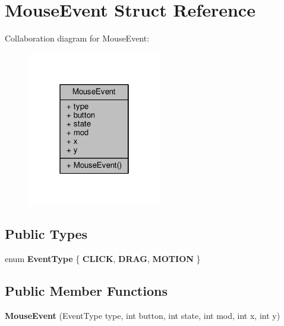 \hypertarget{structMouseEvent}{}\section{Mouse\+Event Struct Reference}
\label{structMouseEvent}


Collaboration diagram for Mouse\+Event\+:
\nopagebreak
\begin{figure}[H]
\begin{center}
\leavevmode
\includegraphics[width=166pt]{d9/df8/structMouseEvent__coll__graph}
\end{center}
\end{figure}
\subsection*{Public Types}
\begin{DoxyCompactItemize}
\item 
enum {\bfseries Event\+Type} \{ {\bfseries C\+L\+I\+CK}, 
{\bfseries D\+R\+AG}, 
{\bfseries M\+O\+T\+I\+ON}
 \}\hypertarget{structMouseEvent_a382b54b4af136716ec3247275aba8306}{}\label{structMouseEvent_a382b54b4af136716ec3247275aba8306}

\end{DoxyCompactItemize}
\subsection*{Public Member Functions}
\begin{DoxyCompactItemize}
\item 
{\bfseries Mouse\+Event} (Event\+Type type, int button, int state, int mod, int x, int y)\hypertarget{structMouseEvent_abffdd0fba337f3bc2f6c8f14bc978a92}{}\label{structMouseEvent_abffdd0fba337f3bc2f6c8f14bc978a92}

\end{DoxyCompactItemize}
